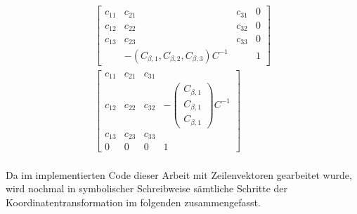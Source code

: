 \begin{gather}
		\begin{bmatrix}
	c_{11} & c_{21} & c_{31} & 0\\
	c_{12} & c_{22} & c_{32} & 0\\
	c_{13} & c_{23} & c_{33} & 0\\
	&-(C_{\beta,1}, C_{\beta,2}, C_{\beta,3})C^{-1}& & 1
	\end{bmatrix}\\
		\begin{bmatrix}
	c_{11} & c_{21} & c_{31} & \\
	c_{12} & c_{22} & c_{32} & -\begin{pmatrix}
	C_{\beta,1}\\C_{\beta,1}\\ C_{\beta,1}
	\end{pmatrix}C^{-1}\\
	c_{13} & c_{23} & c_{33} &\\
	0&0&0&1
	\end{bmatrix}
\end{gather}\\

Da im implementierten Code dieser Arbeit mit Zeilenvektoren gearbeitet wurde, wird nochmal in symbolischer Schreibweise sämtliche Schritte der Koordinatentransformation im folgenden zusammengefasst. 

